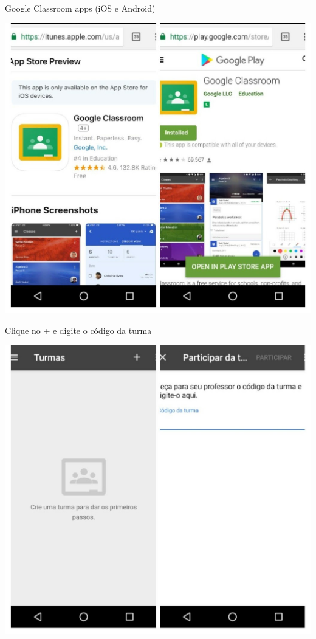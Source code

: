 \documentclass{beamer}
\begin{document}
\begin{frame}{Google Classroom apps (iOS e Android)}
  \begin{center}
    \includegraphics[height=\textheight]{Intro/gclassroom-apps}
  \end{center}
\end{frame}

\begin{frame}{Clique no + e digite o código da turma}
  \begin{center}
    \includegraphics[height=\textheight]{Intro/gclassroom-turma}
  \end{center}
\end{frame}
\end{document}
